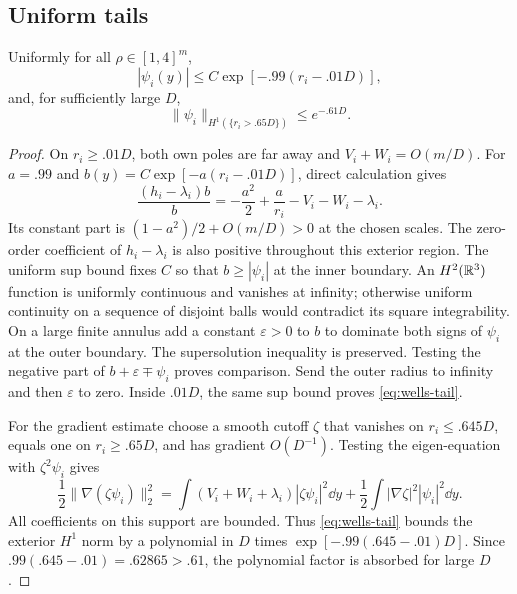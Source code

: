 \subsection{Uniform tails}

\begin{lemma}
\label{lem:well-tail}
Uniformly for all \(\rho\in[1,4]^m\),
\begin{equation}
 |\psi_i(y)|\le C\exp[-.99(r_i-.01D)],
 \label{eq:wells-tail}
\end{equation}
and, for sufficiently large \(D\),
\begin{equation}
 \|\psi_i\|_{H^1(\{r_i>.65D\})}\le e^{-.61D}.
 \label{eq:wells-h1-tail}
\end{equation}
\end{lemma}

\begin{proof}
On \(r_i\ge .01D\), both own poles are far away and
\(V_i+W_i=O(m/D)\). For \(a=.99\) and
\(b(y)=C\exp[-a(r_i-.01D)]\), direct calculation gives
\[
 \frac{(h_i-\lambda_i)b}{b}
 =-\frac{a^2}{2}+\frac a{r_i}-V_i-W_i-\lambda_i.
\]
Its constant part is \((1-a^2)/2+O(m/D)>0\) at the chosen scales.
The zero-order coefficient of \(h_i-\lambda_i\) is also positive
throughout this exterior region. The uniform sup bound fixes \(C\)
so that \(b\ge|\psi_i|\) at the inner boundary. An \(H^2(\mathbb R^3)\) function
is uniformly continuous and vanishes at infinity; otherwise uniform
continuity on a sequence of disjoint balls would contradict its
square integrability. On a large finite annulus add a constant
\(\varepsilon>0\) to \(b\) to dominate both signs of \(\psi_i\) at the
outer boundary. The supersolution inequality is preserved.
Testing the negative part of \(b+\varepsilon\mp\psi_i\) proves
comparison. Send the outer radius to infinity and then
\(\varepsilon\) to zero. Inside \(.01D\), the same sup bound proves
\eqref{eq:wells-tail}.

For the gradient estimate choose a smooth cutoff \(\zeta\) that vanishes
on \(r_i\le .645D\), equals one on \(r_i\ge .65D\), and has gradient
\(O(D^{-1})\). Testing the eigen-equation with \(\zeta^2\psi_i\) gives
\[
 \frac12\|\nabla(\zeta\psi_i)\|_2^2
 =\int(V_i+W_i+\lambda_i)|\zeta\psi_i|^2\dd y
       +\frac12\int|\nabla\zeta|^2|\psi_i|^2\dd y.
\]
All coefficients on this support are bounded. Thus
\eqref{eq:wells-tail} bounds the exterior \(H^1\) norm by a polynomial in
\(D\) times \(\exp[-.99(.645-.01)D]\).
Since \(.99(.645-.01)=.62865>.61\), the polynomial factor is absorbed
for large \(D\).
\end{proof}

